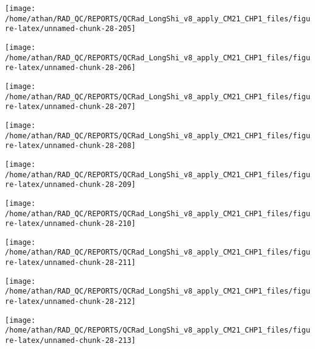 \documentclass[
  10pt,
  a4paper,oneside]{article}
\begin{document}
\begin{center}\texttt{[image: /home/athan/RAD\_QC/REPORTS/QCRad\_LongShi\_v8\_apply\_CM21\_CHP1\_files/figure-latex/unnamed-chunk-28-205]} \end{center}

\begin{center}\texttt{[image: /home/athan/RAD\_QC/REPORTS/QCRad\_LongShi\_v8\_apply\_CM21\_CHP1\_files/figure-latex/unnamed-chunk-28-206]} \end{center}

\begin{center}\texttt{[image: /home/athan/RAD\_QC/REPORTS/QCRad\_LongShi\_v8\_apply\_CM21\_CHP1\_files/figure-latex/unnamed-chunk-28-207]} \end{center}

\begin{center}\texttt{[image: /home/athan/RAD\_QC/REPORTS/QCRad\_LongShi\_v8\_apply\_CM21\_CHP1\_files/figure-latex/unnamed-chunk-28-208]} \end{center}

\begin{center}\texttt{[image: /home/athan/RAD\_QC/REPORTS/QCRad\_LongShi\_v8\_apply\_CM21\_CHP1\_files/figure-latex/unnamed-chunk-28-209]} \end{center}

\begin{center}\texttt{[image: /home/athan/RAD\_QC/REPORTS/QCRad\_LongShi\_v8\_apply\_CM21\_CHP1\_files/figure-latex/unnamed-chunk-28-210]} \end{center}

\begin{center}\texttt{[image: /home/athan/RAD\_QC/REPORTS/QCRad\_LongShi\_v8\_apply\_CM21\_CHP1\_files/figure-latex/unnamed-chunk-28-211]} \end{center}

\begin{center}\texttt{[image: /home/athan/RAD\_QC/REPORTS/QCRad\_LongShi\_v8\_apply\_CM21\_CHP1\_files/figure-latex/unnamed-chunk-28-212]} \end{center}

\begin{center}\texttt{[image: /home/athan/RAD\_QC/REPORTS/QCRad\_LongShi\_v8\_apply\_CM21\_CHP1\_files/figure-latex/unnamed-chunk-28-213]} \end{center}
\end{document}

